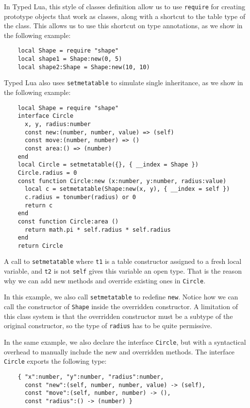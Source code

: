 In Typed Lua, this style of classes definition allow us to use \texttt{require}
for creating prototype objects that work as classes,
along with a shortcut to the table type of the class.
This allows us to use this shortcut on type annotations,
as we show in the following example:
\begin{verbatim}
    local Shape = require "shape"
    local shape1 = Shape:new(0, 5)
    local shape2:Shape = Shape:new(10, 10)
\end{verbatim}

Typed Lua also uses \texttt{setmetatable} to simulate single inheritance,
as we show in the following example:

\begin{verbatim}
    local Shape = require "shape"
    interface Circle
      x, y, radius:number
      const new:(number, number, value) => (self)
      const move:(number, number) => ()
      const area:() => (number)
    end
    local Circle = setmetatable({}, { __index = Shape })
    Circle.radius = 0
    const function Circle:new (x:number, y:number, radius:value)
      local c = setmetatable(Shape:new(x, y), { __index = self })
      c.radius = tonumber(radius) or 0
      return c
    end
    const function Circle:area ()
      return math.pi * self.radius * self.radius
    end
    return Circle
\end{verbatim}

A call to \texttt{setmetatable} where \texttt{t1} is a table
constructor assigned to a fresh local variable, and \texttt{t2}
is not \texttt{self} gives this variable an open type.
That is the reason why we can add new methods and override
existing ones in \texttt{Circle}.

In this example, we also call \texttt{setmetatable} to redefine \texttt{new}.
Notice how we can call the constructor of \texttt{Shape} inside
the overridden constructor.
A limitation of this class system is that the overridden constructor
must be a subtype of the original constructor,
so the type of \texttt{radius} has to be quite permissive.

In the same example, we also declare the interface \texttt{Circle},
but with a syntactical overhead to manually include the new and
overridden methods.
The interface \texttt{Circle} exports the following type:
\begin{verbatim}
    { "x":number, "y":number, "radius":number,
      const "new":(self, number, number, value) -> (self),
      const "move":(self, number, number) -> (),
      const "radius":() -> (number) }
\end{verbatim}

